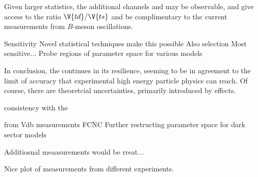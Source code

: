 Given larger statistics, the additional channels \decay{\Bp}{\Kp\Km\pip} and \decay{\Bp}{\pip\pipi}
may be observable, and give access to the ratio $\V{td}/\V{ts}$ and be complimentary to the current
measurements from $B$-meson oscillations.




\btokstrdb
Sensitivity
Novel statistical techniques make this possible
Also selection
Most sensitive...
Probe regions of parameter space for various models



In conclusion, the \sm continues in its resilience, seeming to be in agreement to the limit of
accuracy that experimental high energy particle physics can reach.
Of course, there are theoretcial uncertainties, primarily introduced by \QCD effects.

consistency with the \sm

from Vdb measurements
FCNC
Further restructing parameter space for dark sector models

Additiosnal meaasurements would be rreat...


Nice plot of measurements from different experiments.








